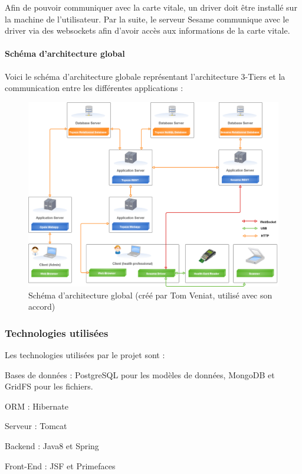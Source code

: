Afin de pouvoir communiquer avec la carte vitale, un driver doit être installé sur la machine de l'utilisateur. Par la suite, le serveur Sesame communique avec le driver via des websockets afin d'avoir accès aux informations de la carte vitale.

\paragraph*{Schéma d'architecture global\\}
Voici le schéma d'architecture globale représentant l'architecture 3-Tiers et la communication entre les différentes applications :
\begin{figure}[H]
  \centering
  \centerline{\includegraphics[width=20cm]{./img/architecture5}}
  \caption{\label{fig:mb_va_ast} Schéma d'architecture global (créé par Tom Veniat, utilisé avec son accord)}
\end{figure}

\subsubsection{Technologies utilisées}
Les technologies utilisées par le projet sont :
\begin{sitemize}
\item Bases de données : PostgreSQL pour les modèles de données, MongoDB et GridFS pour les fichiers.
\item ORM : Hibernate\cite{bib:hibernate}
\item Serveur : Tomcat
\item Backend : Java8\cite{bib:java8} et Spring\cite{bib:spring}
\item Front-End : JSF\cite{bib:jsf} et Primefaces
\end{sitemize} 

